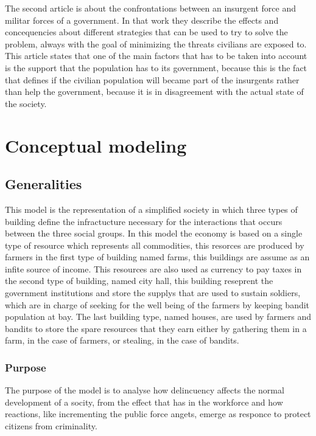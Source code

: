 \documentclass{wscpaperproc}
\theoremstyle{wsc}
\begin{document}
The second article is about the confrontations between an insurgent force and    
militar forces of a government. In that work they describe the effects and       
concequencies about different strategies that can be used to try to solve the    
problem, always with the goal of minimizing the threats civilians are exposed to.
This article states that one of the main factors that has to be taken   
into account is the support that the population has to its government, because   
this is the fact that defines if the civilian population will became part of the 
insurgents rather than help the government, because it is in disagreement with
the actual state of the society. \cite{article2}

\section{Conceptual modeling}

\subsection{Generalities}

This model is the representation of a simplified society in which three types
of building define the infractucture necessary for the interactions that occurs
between the three social groups. In this model the
economy is based on a single type of resource which represents all commodities,
this resorces are produced by farmers in the first type of building named
farms, this buildings are assume as an infite source of income. This
resources are also used as currency to pay taxes in the second type of
building, named city hall, this building reseprent the government
institutions and store the supplys that are used to sustain soldiers,
which are in charge of seeking for the well being of the farmers by
keeping bandit population at bay. The last building type, named houses,
are used by farmers and bandits to store the spare resources that they
earn either by gathering them in a farm, in the case of farmers, or
stealing, in the case of bandits.

\subsubsection{Purpose}

The purpose of the model is to analyse how delincuency affects the normal
development of a socity, from the effect that has in the workforce and how
reactions, like incrementing the public force angets, emerge as responce to
protect citizens from criminality.
\end{document}
